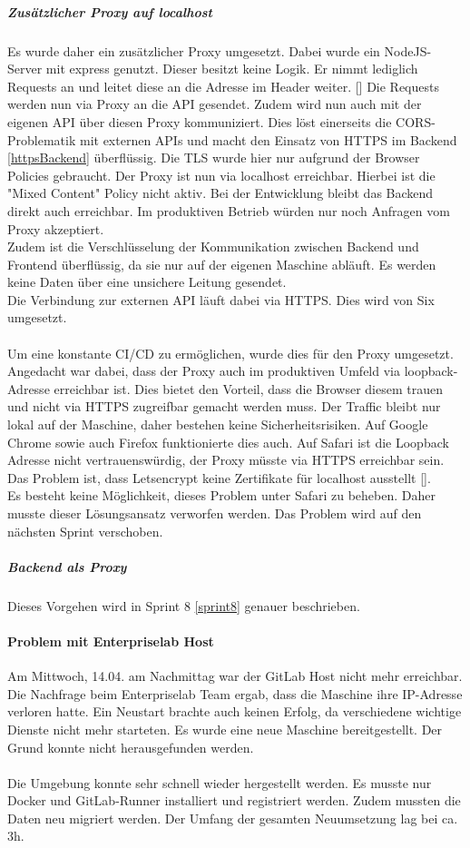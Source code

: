 \subparagraph{Zusätzlicher Proxy auf localhost}\label{corsLocalhost}
Es wurde daher ein zusätzlicher Proxy umgesetzt. Dabei wurde ein NodeJS-Server mit express genutzt. Dieser besitzt keine Logik. Er nimmt lediglich Requests an und leitet diese an die Adresse im Header weiter. [\cite{corsProxy}] Die Requests werden nun via Proxy an die API gesendet. Zudem wird nun auch mit der eigenen API über diesen Proxy kommuniziert. Dies löst einerseits die \ac{CORS}-Problematik mit externen APIs und macht den Einsatz von HTTPS im Backend \ref{httpsBackend} überflüssig. Die \ac{TLS} wurde hier nur aufgrund der Browser Policies gebraucht. Der Proxy ist nun via localhost erreichbar. Hierbei ist die "Mixed Content" Policy nicht aktiv. Bei der Entwicklung bleibt das Backend direkt auch erreichbar. Im produktiven Betrieb würden nur noch Anfragen vom Proxy akzeptiert. \\
Zudem ist die Verschlüsselung der Kommunikation zwischen Backend und Frontend überflüssig, da sie nur auf der eigenen Maschine abläuft. Es werden keine Daten über eine unsichere Leitung gesendet. \\
Die Verbindung zur externen API läuft dabei via HTTPS. Dies wird von Six umgesetzt.\\\\
Um eine konstante \ac{CI/CD} zu ermöglichen, wurde dies für den Proxy umgesetzt. 
Angedacht war dabei, dass der Proxy auch im produktiven Umfeld via loopback-Adresse erreichbar ist. Dies bietet den Vorteil, dass die Browser diesem trauen und nicht via HTTPS zugreifbar gemacht werden muss. Der Traffic bleibt nur lokal auf der Maschine, daher bestehen keine Sicherheitsrisiken. Auf Google Chrome sowie auch Firefox funktionierte dies auch. Auf Safari ist die Loopback Adresse nicht vertrauenswürdig, der Proxy müsste via HTTPS erreichbar sein. Das Problem ist, dass Letsencrypt keine Zertifikate für localhost ausstellt [\cite{letsencryptLocalhost}].\\
Es besteht keine Möglichkeit, dieses Problem unter Safari zu beheben. Daher musste dieser Lösungsansatz verworfen werden. Das Problem wird auf den nächsten Sprint verschoben. 

\subparagraph{Backend als Proxy}
Dieses Vorgehen wird in Sprint 8 \ref{sprint8} genauer beschrieben. 
\paragraph{Problem mit Enterpriselab Host}
Am Mittwoch, 14.04. am Nachmittag war der GitLab Host nicht mehr erreichbar. Die Nachfrage beim Enterpriselab Team ergab, dass die Maschine ihre IP-Adresse verloren hatte. Ein Neustart brachte auch keinen Erfolg, da verschiedene wichtige Dienste nicht mehr starteten. Es wurde eine neue Maschine bereitgestellt. Der Grund konnte nicht herausgefunden werden. \\\\
Die Umgebung konnte sehr schnell wieder hergestellt werden. Es musste nur Docker und GitLab-Runner installiert und registriert werden. Zudem mussten die Daten neu migriert werden. Der Umfang der gesamten Neuumsetzung lag bei ca. 3h. 


